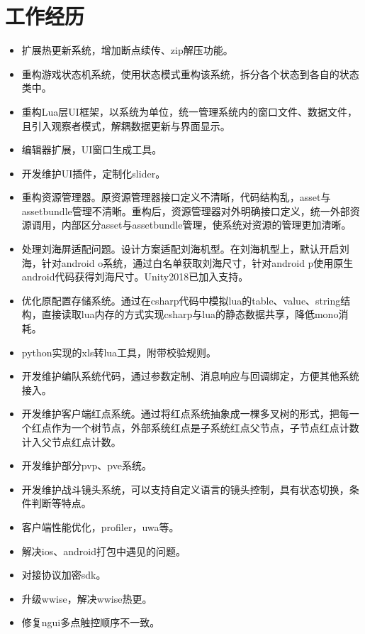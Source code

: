 \documentclass{resume}
\begin{document}
\section{工作经历}
\begin{itemize}
  \item 扩展热更新系统，增加断点续传、zip解压功能。
  \item 重构游戏状态机系统，使用状态模式重构该系统，拆分各个状态到各自的状态类中。
  \item 重构Lua层UI框架，以系统为单位，统一管理系统内的窗口文件、数据文件，且引入观察者模式，解耦数据更新与界面显示。
  \item 编辑器扩展，UI窗口生成工具。
  \item 开发维护UI插件，定制化slider。
  \item 重构资源管理器。原资源管理器接口定义不清晰，代码结构乱，asset与assetbundle管理不清晰。重构后，资源管理器对外明确接口定义，统一外部资源调用，内部区分asset与assetbundle管理，使系统对资源的管理更加清晰。
  \item 处理刘海屏适配问题。设计方案适配刘海机型。在刘海机型上，默认开启刘海，针对android o系统，通过白名单获取刘海尺寸，针对android p使用原生android代码获得刘海尺寸。Unity2018已加入支持。
  \item 优化原配置存储系统。通过在csharp代码中模拟lua的table、value、string结构，直接读取lua内存的方式实现csharp与lua的静态数据共享，降低mono消耗。
  \item python实现的xls转lua工具，附带校验规则。
  \item 开发维护编队系统代码，通过参数定制、消息响应与回调绑定，方便其他系统接入。
  \item 开发维护客户端红点系统。通过将红点系统抽象成一棵多叉树的形式，把每一个红点作为一个树节点，外部系统红点是子系统红点父节点，子节点红点计数计入父节点红点计数。
  \item 开发维护部分pvp、pve系统。
  \item 开发维护战斗镜头系统，可以支持自定义语言的镜头控制，具有状态切换，条件判断等特点。
  \item 客户端性能优化，profiler，uwa等。
  \item 解决ios、android打包中遇见的问题。
  \item 对接协议加密sdk。
  \item 升级wwise，解决wwise热更。
  \item 修复ngui多点触控顺序不一致。
\end{itemize}
\end{document}
